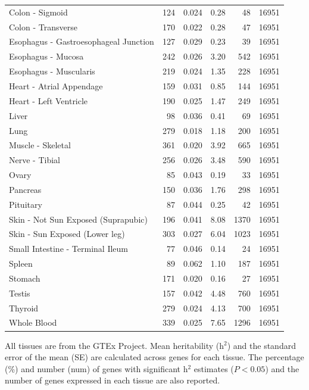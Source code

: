 \documentclass[10pt,letterpaper]{article}
\begin{document}
\begin{table}[!ht]
\begin{adjustwidth}{-2.25in}{0in}
\begin{tabular}{lrrrrr}
  Colon - Sigmoid & 124 & 0.024 & 0.28 & 48 & 16951 \\ 
  Colon - Transverse & 170 & 0.022 & 0.28 & 47 & 16951 \\ 
  Esophagus - Gastroesophageal Junction & 127 & 0.029 & 0.23 & 39 & 16951 \\ 
  Esophagus - Mucosa & 242 & 0.026 & 3.20 & 542 & 16951 \\ 
  Esophagus - Muscularis & 219 & 0.024 & 1.35 & 228 & 16951 \\ 
  Heart - Atrial Appendage & 159 & 0.031 & 0.85 & 144 & 16951 \\ 
  Heart - Left Ventricle & 190 & 0.025 & 1.47 & 249 & 16951 \\ 
  Liver & 98 & 0.036 & 0.41 & 69 & 16951 \\ 
  Lung & 279 & 0.018 & 1.18 & 200 & 16951 \\ 
  Muscle - Skeletal & 361 & 0.020 & 3.92 & 665 & 16951 \\ 
  Nerve - Tibial & 256 & 0.026 & 3.48 & 590 & 16951 \\ 
  Ovary & 85 & 0.043 & 0.19 & 33 & 16951 \\ 
  Pancreas & 150 & 0.036 & 1.76 & 298 & 16951 \\ 
  Pituitary & 87 & 0.044 & 0.25 & 42 & 16951 \\ 
  Skin - Not Sun Exposed (Suprapubic) & 196 & 0.041 & 8.08 & 1370 & 16951 \\ 
  Skin - Sun Exposed (Lower leg) & 303 & 0.027 & 6.04 & 1023 & 16951 \\ 
  Small Intestine - Terminal Ileum & 77 & 0.046 & 0.14 & 24 & 16951 \\ 
  Spleen & 89 & 0.062 & 1.10 & 187 & 16951 \\ 
  Stomach & 171 & 0.020 & 0.16 & 27 & 16951 \\ 
  Testis & 157 & 0.042 & 4.48 & 760 & 16951 \\ 
  Thyroid & 279 & 0.024 & 4.13 & 700 & 16951 \\ 
  Whole Blood & 339 & 0.025 & 7.65 & 1296 & 16951 \\ 
   \hline
\end{tabular}
\begin{flushleft} All tissues are from the GTEx Project. Mean heritability (h$^2$) and the standard error of the mean (SE) are calculated across genes for each tissue. The percentage (\%) and number (num) of genes with significant h$^2$ estimates ($P<0.05$) and the number of genes expressed in each tissue are also reported. 
\end{flushleft}
\end{adjustwidth}
\end{table}
\end{document}
